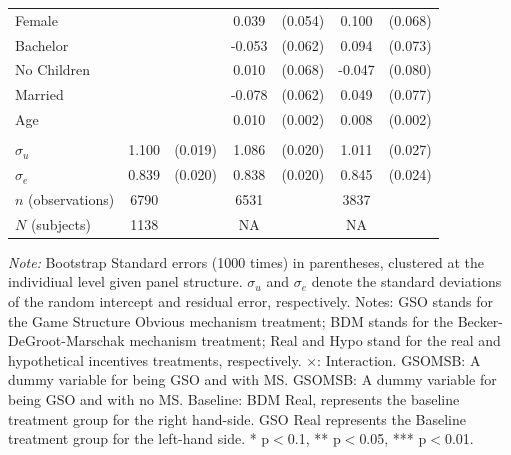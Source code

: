 \documentclass[12pt]{article}
\newcommand{\sym}[1]{\rlap{$^{#1}$}}
\begin{document}
\begin{table}[H]
{\begin{tabular}{l*{3}{cc}}
Female      &                     &            &       0.039         &     (0.054)&       0.100         &     (0.068)\\
Bachelor    &                     &            &      -0.053         &     (0.062)&       0.094         &     (0.073)\\
No Children &                     &            &       0.010         &     (0.068)&      -0.047         &     (0.080)\\
Married     &                     &            &      -0.078         &     (0.062)&       0.049         &     (0.077)\\
Age         &                     &            &       0.010\sym{***}&     (0.002)&       0.008\sym{***}&     (0.002)\\
        \\
$\sigma_u $    &       1.100\sym{***}&     (0.019)&       1.086\sym{***}&     (0.020)&       1.011\sym{***}&     (0.027)\\
$\sigma_e$     &       0.839\sym{***}&     (0.020)&       0.838\sym{***}&     (0.020)&       0.845\sym{***}&     (0.024)\\


\hline
\(n\) (observations)      &        6790         &            &        6531         &            &        3837         &            \\

\(N\) (subjects)       &        1138         &            &       NA         &            &        NA       &            \\
\hline\hline
\end{tabular}
}


\begin{tablenotes}
            \footnotesize
            \item \textit{Note:} Bootstrap Standard errors (1000 times) in parentheses, clustered at the individiual level given panel structure. $\sigma_u$ and $\sigma_e$ denote the standard deviations of the random intercept and residual error, respectively. Notes: GSO stands for the Game Structure Obvious mechanism treatment; BDM stands for the Becker-DeGroot-Marschak mechanism treatment; Real and Hypo stand for the real and hypothetical incentives treatments, respectively. $\times$: Interaction. GSOMSB: A dummy variable for being GSO and with MS. GSOMSB: A dummy variable for being GSO and with no MS. Baseline: BDM Real, represents the baseline treatment group for the right hand-side. GSO Real represents the Baseline treatment group for the left-hand side. * p$<$0.1, ** p$<$0.05, *** p$<$0.01.
        \end{tablenotes}

\end{table}
\end{document}
